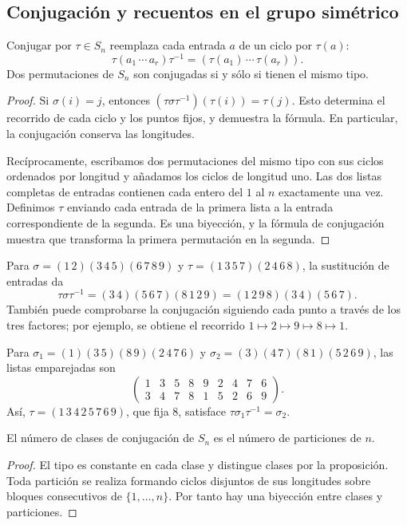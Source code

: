 \subsection{Conjugación y recuentos en el grupo simétrico}\label{tema:9-1-2}
\begin{prop}\label{prop:C9-conjugacion}
Conjugar por $\tau\in S_n$ reemplaza cada entrada $a$ de un ciclo por $\tau(a)$:
\[
\tau(a_1\,\cdots\,a_r)\tau^{-1}
=(\tau(a_1)\,\cdots\,\tau(a_r)).
\]
Dos permutaciones de $S_n$ son conjugadas si y sólo si tienen el mismo tipo.
\end{prop}
\begin{proof}
Si $\sigma(i)=j$, entonces $(\tau\sigma\tau^{-1})(\tau(i))=\tau(j)$. Esto determina el recorrido de cada ciclo y los puntos fijos, y demuestra la fórmula. En particular, la conjugación conserva las longitudes.

Recíprocamente, escribamos dos permutaciones del mismo tipo con sus ciclos ordenados por longitud y añadamos los ciclos de longitud uno. Las dos listas completas de entradas contienen cada entero del $1$ al $n$ exactamente una vez. Definimos $\tau$ enviando cada entrada de la primera lista a la entrada correspondiente de la segunda. Es una biyección, y la fórmula de conjugación muestra que transforma la primera permutación en la segunda.
\end{proof}
\begin{ejem}
Para $\sigma=(1\,2)(3\,4\,5)(6\,7\,8\,9)$ y $\tau=(1\,3\,5\,7)(2\,4\,6\,8)$, la sustitución de entradas da
\[
\tau\sigma\tau^{-1}=(3\,4)(5\,6\,7)(8\,1\,2\,9)
=(1\,2\,9\,8)(3\,4)(5\,6\,7).
\]
También puede comprobarse la conjugación siguiendo cada punto a través de los tres factores; por ejemplo, se obtiene el recorrido $1\mapsto2\mapsto9\mapsto8\mapsto1$.

Para $\sigma_1=(1)(3\,5)(8\,9)(2\,4\,7\,6)$ y $\sigma_2=(3)(4\,7)(8\,1)(5\,2\,6\,9)$, las listas emparejadas son
\[
\begin{pmatrix}1&3&5&8&9&2&4&7&6\\3&4&7&8&1&5&2&6&9\end{pmatrix}.
\]
Así, $\tau=(1\,3\,4\,2\,5\,7\,6\,9)$, que fija $8$, satisface $\tau\sigma_1\tau^{-1}=\sigma_2$.
\end{ejem}
\begin{coro}
El número de clases de conjugación de $S_n$ es el número de particiones de $n$.
\end{coro}
\begin{proof}
El tipo es constante en cada clase y distingue clases por la proposición. Toda partición se realiza formando ciclos disjuntos de sus longitudes sobre bloques consecutivos de $\{1,\ldots,n\}$. Por tanto hay una biyección entre clases y particiones.
\end{proof}

